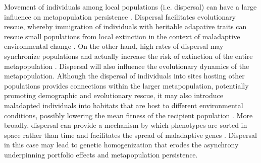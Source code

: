 \documentclass{revtex4}
\begin{document}
Movement of individuals among local populations (i.e. dispersal) can have a large influence on metapopulation persistence \citep{MilnerGulland:2011vm}. 
Dispersal facilitates evolutionary rescue, whereby immigration of individuals with heritable adapative traits can rescue small populations from local extinction in the context of maladaptive environmental change \citep{Bell:2011ki,Carlson:2014is}.
On the other hand, high rates of dispersal may synchronize populations and actually increase the risk of extinction of the entire metapopulation \citep{Earn:2000fm}. 
Dispersal will also influence the evolutionary dynamics of the metapopulation.
Although the dispersal of individuals into sites hosting other populations provides connections within the larger metapopulation, potentially promoting demographic and evolutionary rescue, it may also introduce maladapted individuals into habitats that are host to different environmental conditions, possibly lowering the mean fitness of the recipient population \citep{Muhlfeld:2014hs}. 
More broadly, dispersal can provide a mechanism by which phenotypes are sorted in space rather than time and facilitates the spread of maladaptive genes \citep{Lowe:2015ft}.
Dispersal in this case may lead to genetic homogenization that erodes the asynchrony underpinning portfolio effects and metapopulation persistence. 
\end{document}
